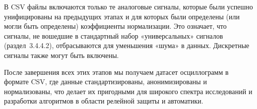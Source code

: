 В CSV файлы включаются только те аналоговые сигналы, которые были успешно унифицированы
на предыдущих этапах и для которых были определены (или могли быть определены)
коэффициенты нормализации. Это означает, что сигналы, не вошедшие в стандартный набор
«универсальных» сигналов (раздел~3.4.4.2), отбрасываются для уменьшения «шума» в данных.
Дискретные сигналы также могут быть включены.

После завершения всех этих этапов мы получаем датасет осциллограмм в формате CSV, где
данные стандартизированы, анонимизированы и нормализованы, что делает их пригодными для
широкого спектра исследований и разработки алгоритмов в области релейной защиты и
автоматики.

